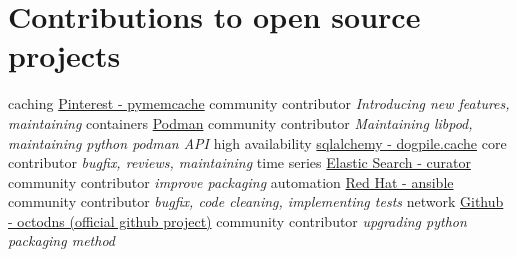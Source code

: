 \documentclass[]{friggeri-cv}
\begin{document}
\section{Contributions to open source projects}
\begin{entrylist}
    \entry
        {caching}
        {\href{https://github.com/pinterest/pymemcache}{Pinterest - pymemcache}}
        {community contributor}
        {\emph{Introducing new features, maintaining}}
    \entry
        {containers}
        {\href{https://github.com/containers/libpod}{Podman}}
        {community contributor}
        {\emph{Maintaining libpod, maintaining python podman API}}
    \entry
        {high availability}
        {\href{https://github.com/sqlalchemy/dogpile.cache}{sqlalchemy - dogpile.cache}}
        {core contributor}
        {\emph{bugfix, reviews, maintaining}}
    \entry
        {time series}
        {\href{https://github.com/ovh/python-ovh}{Elastic Search - curator}}
        {community contributor}
        {\emph{improve packaging}}
    \entry
        {automation}
        {\href{https://github.com/ansible/ansible}{Red Hat - ansible}}
        {community contributor}
        {\emph{bugfix, code cleaning, implementing tests}}
    \entry
        {network}
        {\href{https://github.com/github/octodns}{Github - octodns (official github project)}}
        {community contributor}
        {\emph{upgrading python packaging method}}
\end{entrylist}


\newpage
\end{document}
